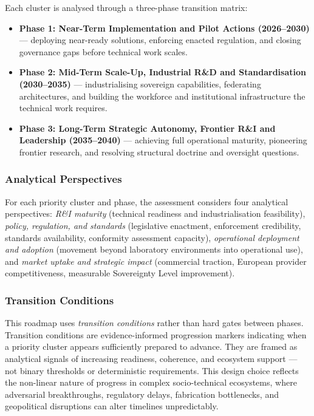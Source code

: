 \documentclass{ieeeaccess}
\begin{document}
Each cluster is analysed through a three-phase transition matrix:

\begin{itemize}
\item
  \textbf{Phase 1: Near-Term Implementation and Pilot Actions
  (2026--2030)} --- deploying near-ready solutions, enforcing enacted
  regulation, and closing governance gaps before technical work scales.
\item
  \textbf{Phase 2: Mid-Term Scale-Up, Industrial R\&D and
  Standardisation (2030--2035)} --- industrialising sovereign
  capabilities, federating architectures, and building the workforce and
  institutional infrastructure the technical work requires.
\item
  \textbf{Phase 3: Long-Term Strategic Autonomy, Frontier R\&I and
  Leadership (2035--2040)} --- achieving full operational maturity,
  pioneering frontier research, and resolving structural doctrine and
  oversight questions.
\end{itemize}

\subsubsection{Analytical
Perspectives}\label{analytical-perspectives}

For each priority cluster and phase, the assessment considers four
analytical perspectives: \emph{R\&I maturity} (technical readiness and
industrialisation feasibility), \emph{policy, regulation, and standards}
(legislative enactment, enforcement credibility, standards availability,
conformity assessment capacity), \emph{operational deployment and
adoption} (movement beyond laboratory environments into operational
use), and \emph{market uptake and strategic impact} (commercial
traction, European provider competitiveness, measurable Sovereignty
Level improvement).

\subsubsection{Transition Conditions}\label{transition-conditions}

This roadmap uses \emph{transition conditions} rather than hard gates
between phases. Transition conditions are evidence-informed progression
markers indicating when a priority cluster appears sufficiently prepared
to advance. They are framed as analytical signals of increasing
readiness, coherence, and ecosystem support --- not binary thresholds or
deterministic requirements. This design choice reflects the non-linear
nature of progress in complex socio-technical ecosystems, where
adversarial breakthroughs, regulatory delays, fabrication bottlenecks,
and geopolitical disruptions can alter timelines unpredictably.
\end{document}
